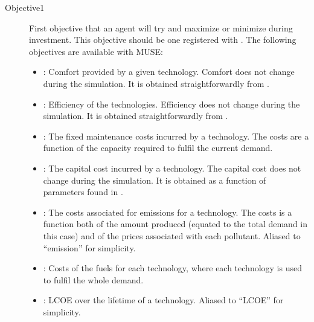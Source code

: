 \documentclass[letterpaper,10pt,english]{sphinxmanual}
\begin{document}
\label{\detokenize{inputs/agents:objective1}}\begin{description}
\item[{Objective1}] \leavevmode
First objective that an agent will try and maximize or minimize during investment.
This objective should be one registered with
. The following objectives are
available with MUSE:
\begin{itemize}
\item {} 
: Comfort provided by a given technology. Comfort does
not change during the simulation. It is obtained straightforwardly from
{\hyperref[\detokenize{inputs/technodata:inputs-technodata}]{}}.

\item {} 
: Efficiency of the technologies. Efficiency does
not change during the simulation. It is obtained straightforwardly from
{\hyperref[\detokenize{inputs/technodata:inputs-technodata}]{}}.

\item {} 
: The fixed maintenance costs incurred by a
technology. The costs are a function of the capacity required to fulfil the current
demand.

\item {} 
: The capital cost incurred by a
technology. The capital cost does not change during the simulation. It is obtained
as a function of parameters found in {\hyperref[\detokenize{inputs/technodata:inputs-technodata}]{}}.

\item {} 
: The costs associated for emissions for a
technology. The costs is a function both of the amount produced (equated to the
total demand in this case) and of the prices associated with each pollutant.
Aliased to “emission” for simplicity.

\item {} 
: Costs of the fuels for
each technology, where each technology is used to fulfil the whole demand.

\item {} 
:
LCOE over the lifetime of a technology. Aliased to “LCOE” for simplicity.


\end{itemize}
\end{description}
\end{document}
